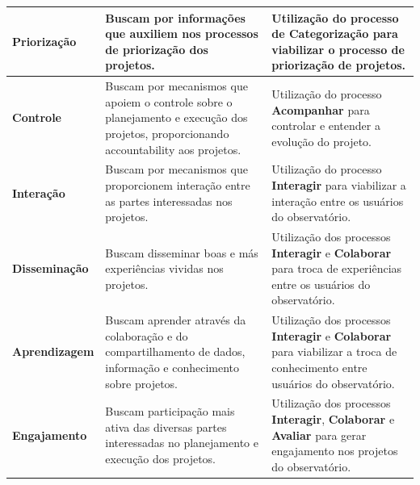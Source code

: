 \begin{apendicesenv}
\begin{table}[H]
\begin{tabularx}{\textwidth}{|l|X|X|}
\textbf{Priorização} & Buscam por informações que auxiliem nos processos de priorização dos projetos.
 & Utilização do processo de \textbf{Categorização} para viabilizar o processo de priorização de projetos. \\ \hline
\textbf{Controle}  & Buscam por mecanismos que apoiem o controle sobre o planejamento e execução dos
projetos, proporcionando accountability aos projetos.
 & Utilização do processo \textbf{Acompanhar} para controlar e entender a evolução do projeto.\\ \hline
\textbf{Interação}   & Buscam por mecanismos que proporcionem interação entre as partes interessadas nos
projetos. & Utilização do processo \textbf{Interagir} para viabilizar a interação entre os usuários do observatório. \\ \hline
\textbf{Disseminação}  & Buscam disseminar boas e más experiências vividas nos projetos.
 & Utilização dos processos \textbf{Interagir} e \textbf{Colaborar} para troca de experiências entre os usuários do observatório. \\ \hline
\textbf{Aprendizagem} & Buscam aprender através da colaboração e do compartilhamento de dados, informação
e conhecimento sobre projetos. & Utilização dos processos \textbf{Interagir} e \textbf{Colaborar} para viabilizar a troca de conhecimento entre usuários do observatório. \\ \hline
\textbf{Engajamento}   & Buscam participação mais ativa das diversas partes interessadas no planejamento e
execução dos projetos.
 & Utilização dos processos \textbf{Interagir}, \textbf{Colaborar} e \textbf{Avaliar} para gerar engajamento nos projetos do observatório. \\ \hline
\end{tabularx}
\end{table}


\end{apendicesenv}
